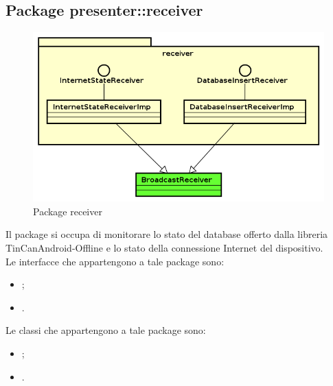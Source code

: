 \documentclass[../Tesi.tex]{subfiles}
\begin{document}
	\subsection{Package presenter::receiver}
		\begin{figure}[H]
			\centering
			\includegraphics[scale=0.6]{images/package_diagrams/receiver}
				\caption{Package receiver}
		\end{figure}
		Il package  si occupa di monitorare lo stato del database offerto dalla libreria TinCanAndroid-Offline e lo stato della connessione Internet del dispositivo. \\
		Le interfacce che appartengono a tale package sono:
		\begin{itemize}
			\item {};
			\item {}.
		\end{itemize}
		Le classi che appartengono a tale package sono:
		\begin{itemize}
			\item {};
			\item {}.
		\end{itemize}
\end{document}
